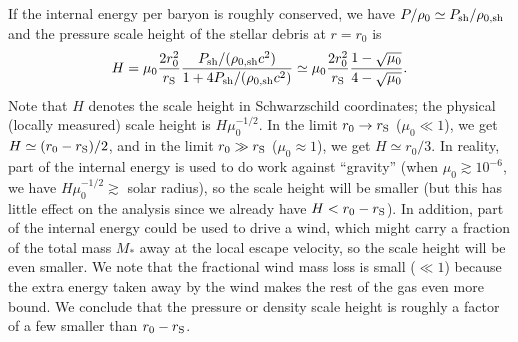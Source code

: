 \documentclass[useAMS,usenatbib]{mn2e}
\begin{document}
If the internal energy per baryon is roughly conserved, we
have $P/\rho_0 \simeq P_{\rm sh}/\rho_{\rm 0,sh}$ and the pressure scale
height of the stellar debris at $r = r_0$ is
\begin{equation}
  \label{eq:16}
  H = \mu_0\frac{2r_0^2}{r_{\rm S}}\frac{P_{\rm sh}/(\rho_{\rm 0,sh}
    c^2)}{1 + 4P_{\rm sh}/(\rho_{\rm 0,sh} c^2)} \simeq
  \mu_0\frac{2r_0^2}{r_{\rm S}} \frac{1 - \sqrt{\mu_0}}{4 -
    \sqrt{\mu_0}}.
\end{equation}
Note that $H$ denotes the scale height in Schwarzschild
coordinates; the physical (locally measured) scale height is
$H\mu_0^{-1/2}$. In the limit $r_0\rightarrow r_{\rm S}$ ($\mu_0\ll
1$), we get $H\simeq (r_0-r_{\rm S})/2$, and in the limit $r_0\gg r_{\rm S}$
($\mu_0\approx 1$), we get $H\simeq r_0/3$. In reality, part of the internal
energy is used to do work against ``gravity'' (when
$\mu_0\gtrsim10^{-6}$, we have $H\mu_0^{-1/2} \gtrsim$ solar radius), so
the scale height will be 
smaller (but this has little effect on the analysis since we already have
$H<r_0-r_{\rm S}$). In addition, part of the internal energy could be
used to drive a wind, which might carry a fraction of the total mass
$M_*$ away at the local escape velocity, so the scale height will
be even smaller. We note that the fractional wind mass loss is small
($\ll1$) because the extra energy taken away by the wind makes the
rest of the gas even more bound. We conclude that the pressure or
density scale height is roughly a factor of a few smaller than 
$r_0-r_{\rm S}$.
\end{document}
